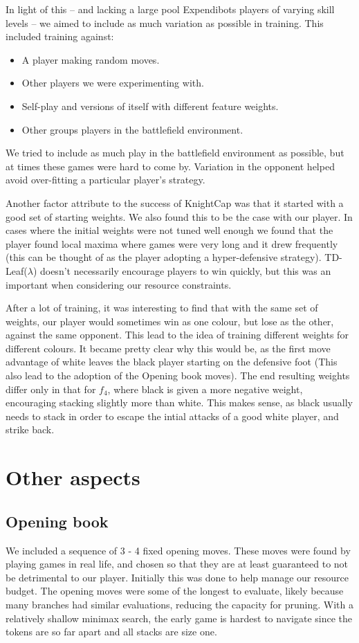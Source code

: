 \documentclass[11pt]{article}
\newcommand{\drafting}[1]{\textcolor{OliveGreen}{#1}}
\begin{document}
In light of this -- and lacking a large pool Expendibots players of varying skill levels -- we aimed to include as much variation as possible in training. This included training against:
\begin{itemize}
    \item A player making random moves.
    \item Other players we were experimenting with.
    \item Self-play and versions of itself with different feature weights.
    \item Other groups players in the battlefield environment.
\end{itemize}
We tried to include as much play in the battlefield environment as possible, but at times these games were hard to come by. Variation in the opponent helped avoid over-fitting a particular player's strategy.

Another factor \cite{baxter_tdleaflambda_1999} attribute to the success of KnightCap was that it started with a good set of starting weights. We also found this to be the case with our player. In cases where the initial weights were not tuned well enough we found that the player found local maxima where games were very long and it drew frequently (this can be thought of as the player adopting a hyper-defensive strategy). TD-Leaf($\lambda$) doesn't necessarily encourage players to win quickly, but this was an important when considering our resource constraints.

\drafting{After a lot of training, it was interesting to find that with the same set of weights, our player would sometimes win as one colour, but lose as the other, against the same opponent. This lead to the idea of training different weights for different colours. It became pretty clear why this would be, as the first move advantage of white leaves the black player starting on the defensive foot (This also lead to the adoption of the Opening book moves). The end resulting weights differ only in that for $f_4$, where black is given a more negative weight, encouraging stacking slightly more than white. This makes sense, as black usually needs to stack in order to escape the intial attacks of a good white player, and strike back.}

\section{Other aspects}
\subsection{Opening book} \label{sec:opening-book}
We included a sequence of \drafting{3 - 4} fixed opening moves. These moves were found by playing games in real life, and chosen so that they are at least guaranteed to not be detrimental to our player. Initially this was done to help manage our resource budget. The opening moves were some of the longest to evaluate, likely because many branches had similar evaluations, reducing the capacity for pruning. With a relatively shallow minimax search, the early game is hardest to navigate since the tokens are so far apart and all stacks are size one.
\end{document}

